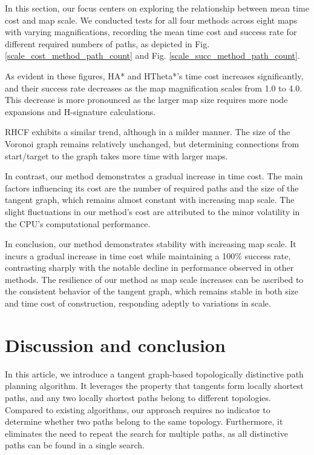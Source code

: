 \documentclass[lettersize,journal]{IEEEtran}
\begin{document}
In this section, our focus centers on exploring the relationship between mean time cost and map scale. We conducted tests for all four methods across eight maps with varying magnifications, recording the mean time cost and success rate for different required numbers of paths, as depicted in Fig. \ref{scale_cost_method_path_count} and Fig. \ref{scale_succ_method_path_count}.

As evident in these figures, HA* and HTheta*'s time cost increases significantly, and their success rate decreases as the map magnification scales from 1.0 to 4.0. This decrease is more pronounced as the larger map size requires more node expansions and H-signature calculations.

RHCF exhibits a similar trend, although in a milder manner. The size of the Voronoi graph remains relatively unchanged, but determining connections from start/target to the graph takes more time with larger maps.

In contrast, our method demonstrates a gradual increase in time cost. The main factors influencing its cost are the number of required paths and the size of the tangent graph, which remains almost constant with increasing map scale. The slight fluctuations in our method's cost are attributed to the minor volatility in the CPU's computational performance.

In conclusion, our method demonstrates stability with increasing map scale. It incurs a gradual increase in time cost while maintaining a 100\% success rate, contrasting sharply with the notable decline in performance observed in other methods. The resilience of our method as map scale increases can be ascribed to the consistent behavior of the tangent graph, which remains stable in both size and time cost of construction, responding adeptly to variations in scale.

\section{Discussion and conclusion}
\label{Conclusion}

In this article, we introduce a tangent graph-based topologically distinctive path planning algorithm. It leverages the property that tangents form locally shortest paths, and any two locally shortest paths belong to different topologies. Compared to existing algorithms, our approach requires no indicator to determine whether two paths belong to the same topology. Furthermore, it eliminates the need to repeat the search for multiple paths, as all distinctive paths can be found in a single search.
\end{document}
